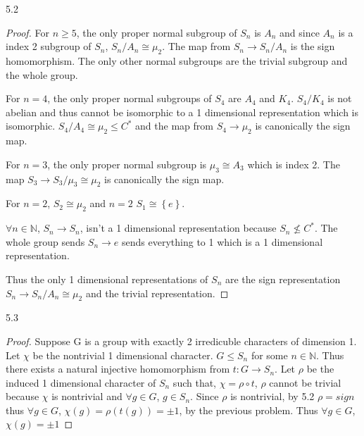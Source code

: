 \documentclass{article}
\newcommand{\N}{\mathbb{N}}
\begin{document}
\bigskip

\begin{PROB}{5.2}\label{Problem 5.2.}
\end{PROB}
\begin{proof}
    For $n \geq 5$, the only proper normal subgroup of $S_n$ is $A_n$ and since $A_n$ is a index 2 subgroup of $S_n$,  $S_n / A_n \cong \mu_2$. The map from $S_n \to S_n / A_n$ is the sign homomorphism. The only other normal subgroups are the trivial subgroup and the whole group. 
    
    For $n = 4$, the only proper normal subgroups of $S_4$ are $A_4$ and $K_4$. $S_4 / K_4$ is not abelian and thus cannot be isomorphic to a 1 dimensional representation which is isomorphic. $S_4 / A_4 \cong \mu_2 \leq C^*$ and the map from $S_4 \to \mu_2$ is canonically the sign map. 
    
    For $n = 3$, the only proper normal subgroup is $\mu_3 \cong A_3$ which is index 2. The map $S_3 \to S_3 / \mu_3 \cong \mu_2$ is canonically the sign map. 

    For $n = 2$, $S_2 \cong \mu_2$ and $n = 2$ $S_1 \cong \left\{ e \right\}$.  
    
    $\forall n \in \N$, $S_n \to S_n$, isn't a 1 dimensional representation because $S_n \not \leq C^*$. The whole group sends $S_n \to {e}$ sends everything to 1 which is a 1 dimensional representation.
    
    Thus the only 1 dimensional representations of $S_n$ are the sign representation $S_n \to S_n / A_n \cong \mu_2$ and the trivial representation.     
\end{proof}

\bigskip

\begin{PROB}{5.3}\label{Problem 5.3.}
\end{PROB}
\begin{proof}
    Suppose G is a group with exactly 2 irredicuble characters of dimension 1. Let $\chi$ be the nontrivial 1 dimensional character. $G \leq S_n$ for some $n \in \N$. Thus there exists a natural injective homomorphism from $t: G \to S_n$. Let $\rho$ be the induced 1 dimensional character of $S_n$ such that, $\chi = \rho \circ t$, $\rho$ cannot be trivial because $\chi$ is nontrivial and $\forall g \in G$, $g \in S_n$. Since $\rho$ is nontrivial, by 5.2 $\rho = sign$ thus $\forall g \in G$, $\chi(g) = \rho(t(g)) = \pm 1$, by the previous problem. Thus $\forall  g \in G$, $\chi(g) =\pm1$             
\end{proof}
\end{document}
